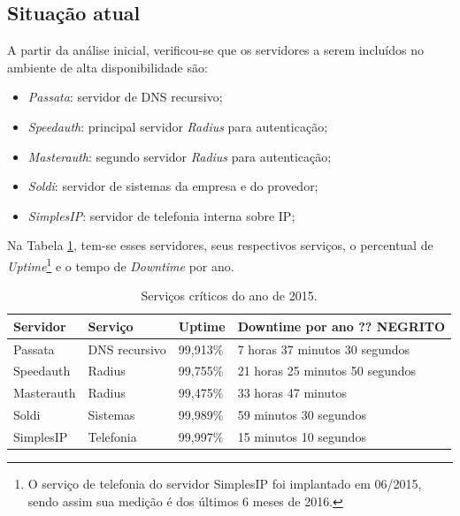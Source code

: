 \subsection{Situação atual}
\label{section:maqservcrit}

A partir da análise inicial, verificou-se que os servidores a serem incluídos no ambiente de alta disponibilidade são:
\begin{itemize}
 \item \textit{Passata}: servidor de \ac{DNS} recursivo;
 \item \textit{Speedauth}: principal servidor \textit{Radius} para autenticação;
 \item \textit{Masterauth}: segundo servidor \textit{Radius} para autenticação;
 \item \textit{Soldi}: servidor de sistemas da empresa e do provedor;
 \item \textit{SimplesIP}: servidor de telefonia interna sobre \ac{IP};
\end{itemize}

Na Tabela \ref{tab:dispservcrit}, tem-se esses servidores, seus respectivos serviços, o percentual de \textit{Uptime}\footnote[2]{O serviço de 
telefonia do servidor SimplesIP foi implantado em 06/2015, sendo assim sua medição é dos últimos 6 meses de 2016.} e o tempo de \textit{Downtime} 
por ano. 

\begin{table}[h!]
\caption{Serviços críticos do ano de 2015.}
\label{tab:dispservcrit}
\begin{center}
\begin{tabular}{|l|l|l|l|}\hline
Servidor & Serviço & Uptime & Downtime por ano ?? NEGRITO \\\hline
Passata & DNS recursivo & 99,913\% & 7 horas 37 minutos 30 segundos \\\hline
Speedauth & Radius & 99,755\% & 21 horas 25 minutos 50 segundos \\\hline
Masterauth & Radius & 99,475\% & 33 horas 47 minutos\\\hline
Soldi & Sistemas & 99,989\% & 59 minutos 30 segundos \\\hline
SimplesIP & Telefonia & 99,997\% & 15 minutos 10 segundos \\\hline %
\end{tabular}
\end{center}
\end{table}

